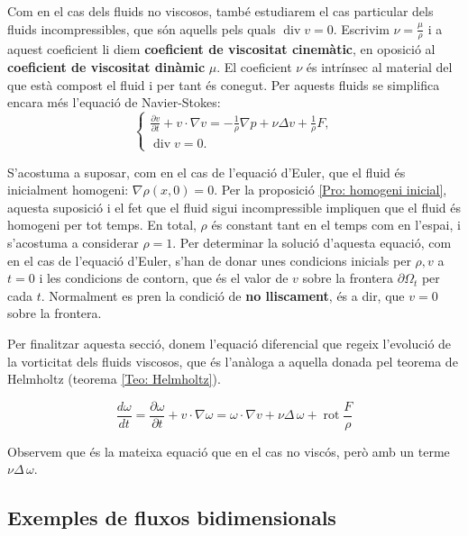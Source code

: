 \documentclass{article}
\numberwithin{equation}{section}
\DeclareMathOperator{\diver}{div}
\DeclareMathOperator{\rot}{rot}
\begin{document}
Com en el cas dels fluids no viscosos, tamb\'{e} estudiarem el cas particular dels fluids incompressibles, que s\'{o}n aquells pels quals $\diver v=0$. Escrivim $\nu=\frac{\mu}{\rho}$ i a aquest coeficient li diem \textbf{coeficient de viscositat cinem\`{a}tic}, en oposici\'{o} al \textbf{coeficient de viscositat din\`{a}mic} $\mu$. El coeficient $\nu$ \'{e}s intr\'{i}nsec al material del que est\`{a} compost el fluid i per tant \'{e}s conegut. Per aquests fluids se simplifica encara m\'{e}s l'equaci\'{o} de Navier-Stokes:
\begin{equation}\label{Equ. Navier-Stokes}
\left\{\begin{array}{l}\displaystyle{\frac{\partial v}{\partial t}+v\cdot\nabla v=-\frac{1}{\rho}\nabla p+\nu\Delta v+\frac{1}{\rho}F,}\\\diver v=0.\end{array}\right.
\end{equation}

S'acostuma a suposar, com en el cas de l'equaci\'{o} d'Euler, que el fluid \'{e}s inicialment homogeni: $\nabla\rho(x,0)=0$. Per la proposici\'{o} \ref{Pro: homogeni inicial}, aquesta suposici\'{o} i el fet que el fluid sigui incompressible impliquen que el fluid \'{e}s homogeni per tot temps. En total, $\rho$ \'{e}s constant tant en el temps com en l'espai, i s'acostuma a considerar $\rho=1$. Per determinar la soluci\'{o} d'aquesta equaci\'{o}, com en el cas de l'equaci\'{o} d'Euler, s'han de donar unes condicions inicials per $\rho,v$ a $t=0$ i les condicions de contorn, que \'{e}s el valor de $v$ sobre la frontera $\partial\Omega_t$ per cada $t$. Normalment es pren la condici\'{o} de \textbf{no lliscament}, \'{e}s a dir, que $v=0$ sobre la frontera.
\vspace{3mm}

Per finalitzar aquesta secci\'{o}, donem l'equaci\'{o} diferencial que regeix l'evoluci\'{o} de la vorticitat dels fluids viscosos, que \'{e}s l'an\`{a}loga a aquella donada pel teorema de Helmholtz (teorema \ref{Teo: Helmholtz}).

\begin{equation}\label{Equ. Helmholtz viscos}
\frac{d\omega}{dt}=\frac{\partial\omega}{\partial t}+v\cdot\nabla\omega=\omega\cdot\nabla v+\nu\Delta\,\omega+\rot\frac{F}{\rho}
\end{equation}

Observem que \'{e}s la mateixa equaci\'{o} que en el cas no visc\'{o}s, per\`{o} amb un terme $\nu\Delta\,\omega$.

\subsection{Exemples de fluxos bidimensionals}
\end{document}
